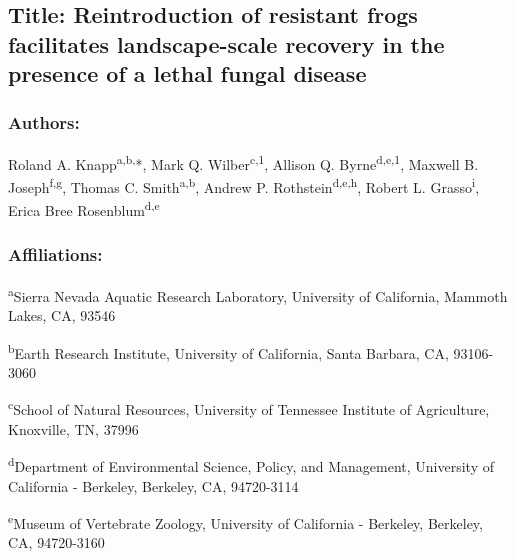 \documentclass[
  letterpaper,
  DIV=11,
  numbers=noendperiod]{scrartcl}
\author{}
\date{}
\begin{document}
\ifdefined\Shaded\renewenvironment{Shaded}{\begin{tcolorbox}[boxrule=0pt, enhanced, borderline west={3pt}{0pt}{shadecolor}, interior hidden, breakable, sharp corners, frame hidden]}{\end{tcolorbox}}\fi

\hypertarget{title-reintroduction-of-resistant-frogs-facilitates-landscape-scale-recovery-in-the-presence-of-a-lethal-fungal-disease}{%
\subsection{Title: Reintroduction of resistant frogs facilitates
landscape-scale recovery in the presence of a lethal fungal
disease}\label{title-reintroduction-of-resistant-frogs-facilitates-landscape-scale-recovery-in-the-presence-of-a-lethal-fungal-disease}}

\hypertarget{authors}{%
\subsubsection{Authors:}\label{authors}}

Roland A. Knapp\textsuperscript{a,b,}*, Mark Q.
Wilber\textsuperscript{c,1}, Allison Q. Byrne\textsuperscript{d,e,1},
Maxwell B. Joseph\textsuperscript{f,g}, Thomas C.
Smith\textsuperscript{a,b}, Andrew P. Rothstein\textsuperscript{d,e,h},
Robert L. Grasso\textsuperscript{i}, Erica Bree
Rosenblum\textsuperscript{d,e}

\hypertarget{affiliations}{%
\subsubsection{Affiliations:}\label{affiliations}}

\textsuperscript{a}Sierra Nevada Aquatic Research Laboratory, University
of California, Mammoth Lakes, CA, 93546

\textsuperscript{b}Earth Research Institute, University of California,
Santa Barbara, CA, 93106-3060

\textsuperscript{c}School of Natural Resources, University of Tennessee
Institute of Agriculture, Knoxville, TN, 37996

\textsuperscript{d}Department of Environmental Science, Policy, and
Management, University of California - Berkeley, Berkeley, CA,
94720-3114

\textsuperscript{e}Museum of Vertebrate Zoology, University of
California - Berkeley, Berkeley, CA, 94720-3160
\end{document}
